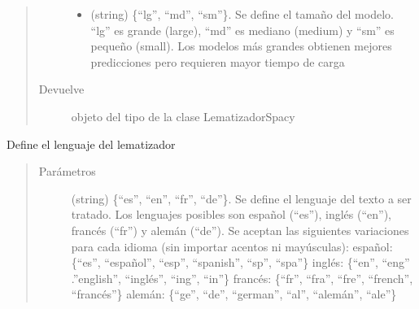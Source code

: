 \documentclass[letterpaper,10pt,openany,spanish]{sphinxmanual}
\begin{document}
\begin{fulllineitems}
\begin{quote}
\begin{description}
\begin{itemize}
\item {} 
 \textendash{} (string) \{“lg”, “md”, “sm”\}. Se define el tamaño 
del modelo. “lg” es grande (large), “md” es mediano (medium) y “sm” es             pequeño (small). Los modelos más grandes obtienen mejores predicciones             pero requieren mayor tiempo de carga

\end{itemize}

\item[{Devuelve}] \leavevmode
objeto del tipo de la clase LematizadorSpacy

\end{description}\end{quote}

\begin{fulllineitems}
\label{\detokenize{funciones/lematizacion:lematizacion.LematizadorSpacy.establecer_lenguaje}}
Define el lenguaje del lematizador
\begin{quote}\begin{description}
\item[{Parámetros}] \leavevmode
{} \textendash{} (string) \{“es”, “en”, “fr”, “de”\}.  Se define el             lenguaje del texto a ser tratado. Los lenguajes posibles son español             (“es”), inglés (“en”), francés (“fr”) y alemán (“de”). Se aceptan las             siguientes variaciones para cada idioma (sin importar acentos ni mayúsculas):                    español: \{“es”, “español”, “esp”, “spanish”, “sp”, “spa”\} 
 inglés: \{“en”, “eng” .”english”, “inglés”, “ing”, “in”\} 
 francés: \{“fr”, “fra”, “fre”, “french”, “francés”\} 
 alemán: \{“ge”, “de”, “german”, “al”, “alemán”, “ale”\}   

\end{description}\end{quote}

\end{fulllineitems}



\end{fulllineitems}
\end{document}
